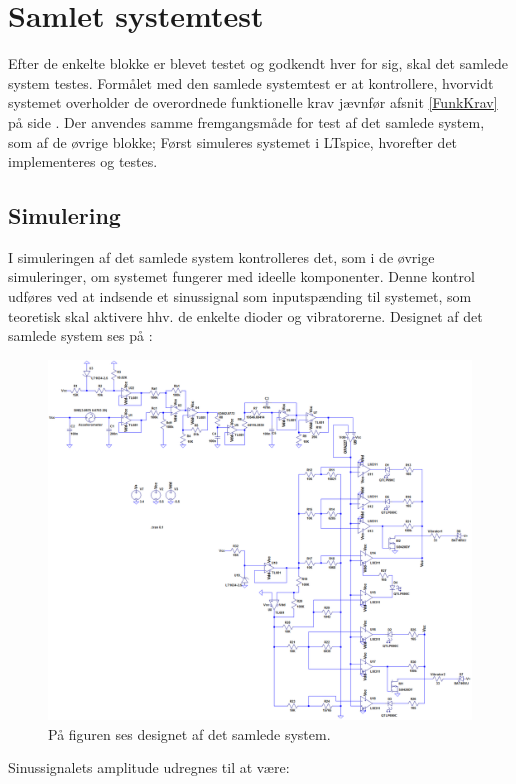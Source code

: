\section{Samlet systemtest}
Efter de enkelte blokke er blevet testet og godkendt hver for sig, skal det samlede system testes. Formålet med den samlede systemtest er at kontrollere, hvorvidt systemet overholder de overordnede funktionelle krav jævnfør afsnit \ref{FunkKrav} på side \pageref{FunkKrav}. Der anvendes samme fremgangsmåde for test af det samlede system, som af de øvrige blokke; Først simuleres systemet i LTspice, hvorefter det implementeres og testes.

\subsection{Simulering}
I simuleringen af det samlede system kontrolleres det, som i de øvrige simuleringer, om systemet fungerer med ideelle komponenter. Denne kontrol udføres ved at indsende et sinussignal som inputspænding til systemet, som teoretisk skal aktivere hhv. de enkelte dioder og vibratorerne. Designet af det samlede system ses på :
\begin{figure}[H]
	\centering
	\includegraphics[scale=.38]{figures/cProblemloesning/Samlet_systemUL.PNG}
	\caption{På figuren ses designet af det samlede system.}
	\label{fig:samlet_system}
\end{figure}
\noindent Sinussignalets amplitude udregnes til at være:
